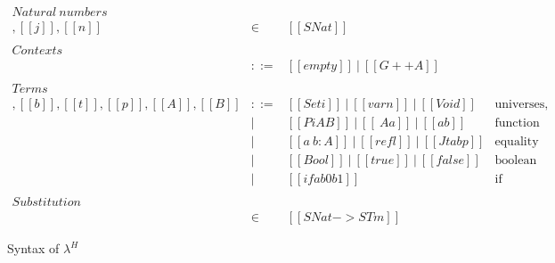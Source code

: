 \documentclass[acmsmall,screen=true,
\ifpublic review=false\else,review=true\fi
  ,anonymous=\ifanonymous true\else false\fi]{acmart}
\newcommand{\lang}{$\lambda^H$\xspace}
\newcommand{\scw}[1]{}
\begin{document}
\begin{figure}[h]
\[
\begin{array}{lcll}
\mathit{Natural\ numbers}\\
[[i]],[[j]],[[n]] & \in &  [[SNat]] &  \\ \\

\mathit{Contexts}\\
[[G]]       & ::= & [[empty]]\ |\ [[G ++ A]] &  \\ \\
\mathit{Terms}\\
[[a]],[[b]],[[t]],[[p]],[[A]],[[B]] & ::= & [[Set i]]\ |\ [[var n]]\  |\ [[Void]]
                  & \mbox{universes, variables, empty type} \\
            & |   & [[Pi A B]]\ |\ [[\ A a]]\ |\ [[a b]]
                  & \mbox{function types, abstractions, applications} \\
            & |   & [[a ~ b : A ]]\ |\  [[refl]]\ |\ [[J t a b p]]
                  & \mbox{equality types, reflexivity proof, J eliminator} \\
            & |   & [[Bool]]\ |\  [[true]]\ |\  [[false]]\ %
                  & \mbox{boolean type, true, false} \\
            & |   & [[if a b0 b1]]
                  & \mbox{if} \\ \\
\mathit{Substitution}\\
[[rho]] & \in & [[SNat -> STm]] &
\end{array}
\]
  \caption{Syntax of \lang \scw{Where does the name come from?}}
  \label{fig:syntax}
\end{figure}

\end{document}
